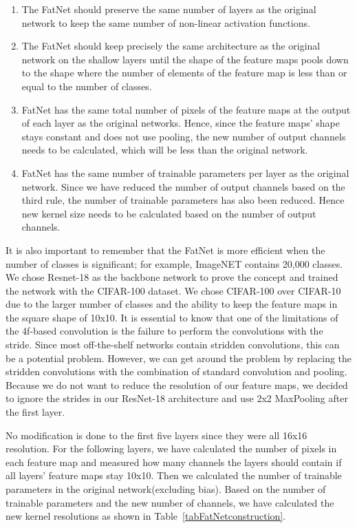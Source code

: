 \documentclass{article}
\begin{document}
\begin{enumerate}
\item The FatNet should preserve the same number of layers as the original network to keep the same number of non-linear activation functions.
\item The FatNet should keep precisely the same architecture as the original network on the shallow layers until the shape of the feature maps pools down to the shape where the number of elements of the feature map is less than or equal to the number of classes. 
\item FatNet has the same total number of pixels of the feature maps at the output of each layer as the original networks. Hence, since the feature maps' shape stays constant and does not use pooling, the new number of output channels needs to be calculated, which will be less than the original network.
\item FatNet has the same number of trainable parameters per layer as the original network. Since we have reduced the number of output channels based on the third rule, the number of trainable parameters has also been reduced. Hence new kernel size needs to be calculated based on the number of output channels. 
\end{enumerate}

It is also important to remember that the FatNet is more efficient when the number of classes is significant; for example, ImageNET contains 20,000 classes. We chose Resnet-18 as the backbone network to prove the concept and trained the network with the CIFAR-100 dataset. We chose CIFAR-100 over CIFAR-10 due to the larger number of classes and the ability to keep the feature maps in the square shape of 10x10. It is essential to know that one of the limitations of the 4f-based convolution is the failure to perform the convolutions with the stride. Since most off-the-shelf networks contain stridden convolutions, this can be a potential problem. However, we can get around the problem by replacing the stridden convolutions with the combination of standard convolution and pooling. Because we do not want to reduce the resolution of our feature maps, we decided to ignore the strides in our ResNet-18 architecture and use 2x2 MaxPooling after the first layer. 

No modification is done to the first five layers since they were all 16x16 resolution. For the following layers, we have calculated the number of pixels in each feature map and measured how many channels the layers should contain if all layers' feature maps stay 10x10. Then we calculated the number of trainable parameters in the original network(excluding bias). Based on the number of trainable parameters and the new number of channels, we have calculated the new kernel resolutions as shown in Table~\ref{tabFatNetconstruction}. 
\end{document}
